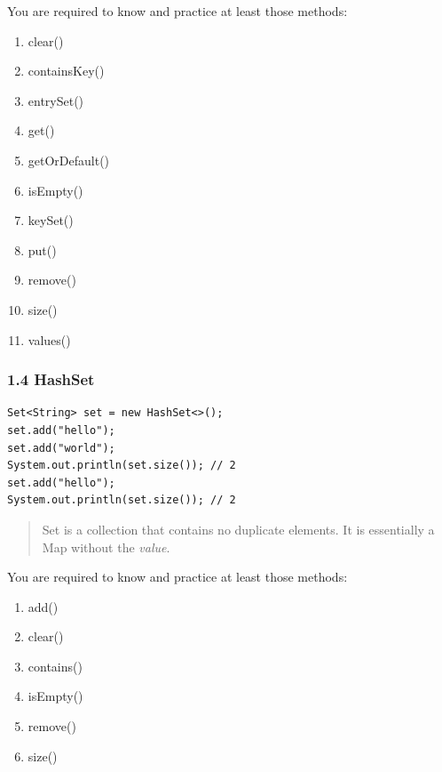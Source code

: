 \documentclass[aspectratio=169, 14pt]{beamer}
\begin{document}
\begin{frame}
    You are required to know and practice at least those methods:
    \begin{enumerate}
        \item clear()
        \item containsKey()
        \item entrySet()
        \item get()
        \item getOrDefault()
        \item isEmpty()
        \item keySet()
        \item put()
        \item remove()
        \item size()
        \item values()
    \end{enumerate}
\end{frame}

\begin{frame}[fragile]
    \frametitle{1.4 HashSet}
    \begin{verbatim}
Set<String> set = new HashSet<>();
set.add("hello");
set.add("world");
System.out.println(set.size()); // 2
set.add("hello");
System.out.println(set.size()); // 2
    \end{verbatim}      
    \begin{quote}
        \alert{Set} is a collection that contains no duplicate elements. It is essentially a \alert{Map} without the \emph{value}.
    \end{quote}
\end{frame}

\begin{frame}
    You are required to know and practice at least those methods:

\begin{enumerate}
\item add()
\item clear()
\item contains()
\item isEmpty()
\item remove()
\item size()
\end{enumerate}
\end{frame}
\end{document}

